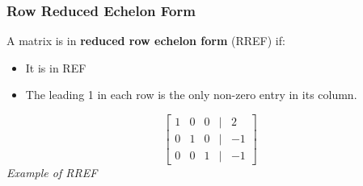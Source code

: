 \documentclass[a4paper, 9pt]{extarticle}
\begin{document}
\subsubsection{Row Reduced Echelon Form}
\begin{minipage}{0.8\textwidth}
  A matrix is in \textbf{reduced row echelon form} (RREF) if:
  \begin{itemize}
    \item It is in REF
    \item The leading 1 in each row is the only non-zero entry in its column.
  \end{itemize}
\end{minipage}
\begin{minipage}{0.2\textwidth}
  \begin{center}
    $$
      \begin{bmatrix}
        1 & 0 & 0 & | & 2  \\
        0 & 1 & 0 & | & -1 \\
        0 & 0 & 1 & | & -1
      \end{bmatrix}
    $$
    \emph{Example of RREF}
  \end{center}
\end{minipage}
\end{document}
